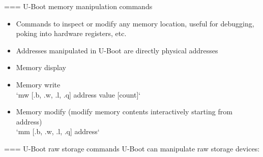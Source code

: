 === {U-Boot memory manipulation commands}
  \begin{itemize}
  \item Commands to inspect or modify any memory location, useful for
    debugging, poking into hardware registers, etc.
  \item Addresses manipulated in U-Boot are directly physical
    addresses
  \item Memory display\\
  \item Memory write\\
    `mw [.b, .w, .l, .q] address value [count]`
  \item Memory modify (modify memory contents interactively starting from address)\\
    `mm [.b, .w, .l, .q] address`
  \end{itemize}


=== {U-Boot raw storage commands}
  U-Boot can manipulate raw storage devices:
  

